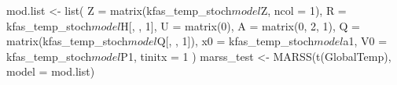 \begin{Schunk}
\begin{Sinput}
 mod.list <- list(
   Z = matrix(kfas_temp_stoch$model$Z, ncol = 1),
   R = kfas_temp_stoch$model$H[, , 1],
   U = matrix(0),
   A = matrix(0, 2, 1),
   Q = matrix(kfas_temp_stoch$model$Q[, , 1]),
   x0 = kfas_temp_stoch$model$a1,
   V0 = kfas_temp_stoch$model$P1,
   tinitx = 1
 )
 marss_test <- MARSS(t(GlobalTemp), model = mod.list)
\end{Sinput}
\end{Schunk}
